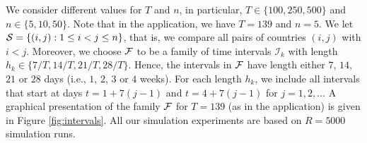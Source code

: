 \documentclass[a4paper,12pt]{article}
\numberwithin{equation}{section}
\begin{document}
We consider different values for $T$ and $n$, in particular, $T \in \{100,250, 500\}$ and $n \in \{5,10,50\}$. Note that in the application, we have $T=139$ and $n=5$. We let $\mathcal{S} = \{ (i,j): 1 \le i < j \le n\}$, that is, we compare all pairs of countries $(i,j)$ with $i < j$. Moreover, we choose $\mathcal{F}$ to be a family of time intervals $\mathcal{I}_k$ with length $h_k \in \{ 7/T,14/T,21/T,28/T \}$. Hence, the intervals in $\mathcal{F}$ have length either $7$, $14$, $21$ or $28$ days (i.e., $1$, $2$, $3$ or $4$ weeks). For each length $h_k$, we include all intervals that start at days $t = 1 + 7(j-1)$ and $t = 4 + 7(j-1)$ for $j=1,2,\ldots$ A graphical presentation of the family $\mathcal{F}$ for $T = 139$ (as in the application) is given in Figure \ref{fig:intervals}. All our simulation experiments are based on $R=5000$ simulation runs. 
\end{document}
